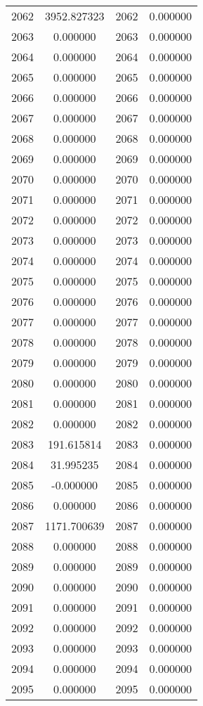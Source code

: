 \documentclass[12pt]{article}
\begin{document}
\begin{longtable}{@{}cccc@{}}
2062 & 3952.827323 & 2062 & 0.000000 \\
2063 & 0.000000 & 2063 & 0.000000 \\
2064 & 0.000000 & 2064 & 0.000000 \\
2065 & 0.000000 & 2065 & 0.000000 \\
2066 & 0.000000 & 2066 & 0.000000 \\
2067 & 0.000000 & 2067 & 0.000000 \\
2068 & 0.000000 & 2068 & 0.000000 \\
2069 & 0.000000 & 2069 & 0.000000 \\
2070 & 0.000000 & 2070 & 0.000000 \\
2071 & 0.000000 & 2071 & 0.000000 \\
2072 & 0.000000 & 2072 & 0.000000 \\
2073 & 0.000000 & 2073 & 0.000000 \\
2074 & 0.000000 & 2074 & 0.000000 \\
2075 & 0.000000 & 2075 & 0.000000 \\
2076 & 0.000000 & 2076 & 0.000000 \\
2077 & 0.000000 & 2077 & 0.000000 \\
2078 & 0.000000 & 2078 & 0.000000 \\
2079 & 0.000000 & 2079 & 0.000000 \\
2080 & 0.000000 & 2080 & 0.000000 \\
2081 & 0.000000 & 2081 & 0.000000 \\
2082 & 0.000000 & 2082 & 0.000000 \\
2083 & 191.615814 & 2083 & 0.000000 \\
2084 & 31.995235 & 2084 & 0.000000 \\
2085 & -0.000000 & 2085 & 0.000000 \\
2086 & 0.000000 & 2086 & 0.000000 \\
2087 & 1171.700639 & 2087 & 0.000000 \\
2088 & 0.000000 & 2088 & 0.000000 \\
2089 & 0.000000 & 2089 & 0.000000 \\
2090 & 0.000000 & 2090 & 0.000000 \\
2091 & 0.000000 & 2091 & 0.000000 \\
2092 & 0.000000 & 2092 & 0.000000 \\
2093 & 0.000000 & 2093 & 0.000000 \\
2094 & 0.000000 & 2094 & 0.000000 \\
2095 & 0.000000 & 2095 & 0.000000 \\

\end{longtable}
\end{document}

